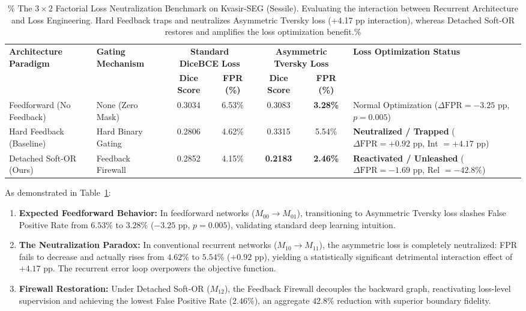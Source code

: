 \begin{table}[t!]
\centering
\caption{\%
  The $3 \times 2$ Factorial Loss Neutralization Benchmark on Kvasir-SEG (Sessile).
  Evaluating the interaction between Recurrent Architecture and Loss Engineering.
  Hard Feedback traps and neutralizes Asymmetric Tversky loss (+4.17 pp interaction),
  whereas Detached Soft-OR restores and amplifies the loss optimization benefit.\%
}
\label{tab:factorial_loss}
\begin{tabularx}{\textwidth}{l l c c c c X}
\toprule
\textbf{Architecture Paradigm}
  & \textbf{Gating Mechanism}
  & \multicolumn{2}{c}{\textbf{Standard DiceBCE Loss}}
  & \multicolumn{2}{c}{\textbf{Asymmetric Tversky Loss}}
  & \textbf{Loss Optimization Status} \\
\cmidrule(lr){3-4} \cmidrule(lr){5-6}
  &
  & \textbf{Dice Score} & \textbf{FPR (\%)}
  & \textbf{Dice Score} & \textbf{FPR (\%)}
  & \\
\midrule
Feedforward (No Feedback)
  & None (Zero Mask)
  & 0.3034 & 6.53\%
  & 0.3083 & \textbf{3.28\%}
  & Normal Optimization ($\Delta\text{FPR} = -3.25\text{ pp}$, $p=0.005$) \\
Hard Feedback (Baseline)
  & Hard Binary Gating
  & 0.2806 & 4.62\%
  & 0.3315 & 5.54\%
  & \textbf{Neutralized / Trapped} ($\Delta\text{FPR} = +0.92\text{ pp}$, Int $= +4.17\text{ pp}$) \\
Detached Soft-OR (Ours)
  & Feedback Firewall
  & 0.2852 & 4.15\%
  & \textbf{0.2183} & \textbf{2.46\%}
  & \textbf{Reactivated / Unleashed} ($\Delta\text{FPR} = -1.69\text{ pp}$, Rel $= -42.8\%$) \\
\bottomrule
\end{tabularx}
\end{table}

As demonstrated in Table~\ref{tab:factorial_loss}:
\begin{enumerate}
  \item \textbf{Expected Feedforward Behavior:} In feedforward networks ($M_{00} \to M_{01}$),
        transitioning to Asymmetric Tversky loss slashes False Positive Rate from
        $6.53\%$ to $3.28\%$ ($-3.25\text{ pp}$, $p = 0.005$), validating standard
        deep learning intuition.
  \item \textbf{The Neutralization Paradox:} In conventional recurrent networks ($M_{10} \to M_{11}$),
        the asymmetric loss is completely neutralized: FPR fails to decrease and
        actually rises from $4.62\%$ to $5.54\%$ ($+0.92\text{ pp}$), yielding a
        statistically significant detrimental interaction effect of $+4.17\text{ pp}$.
        The recurrent error loop overpowers the objective function.
  \item \textbf{Firewall Restoration:} Under Detached Soft-OR ($M_{12}$), the
        Feedback Firewall decouples the backward graph, reactivating loss-level
        supervision and achieving the lowest False Positive Rate ($2.46\%$), an
        aggregate $42.8\%$ reduction with superior boundary fidelity.
\end{enumerate}

